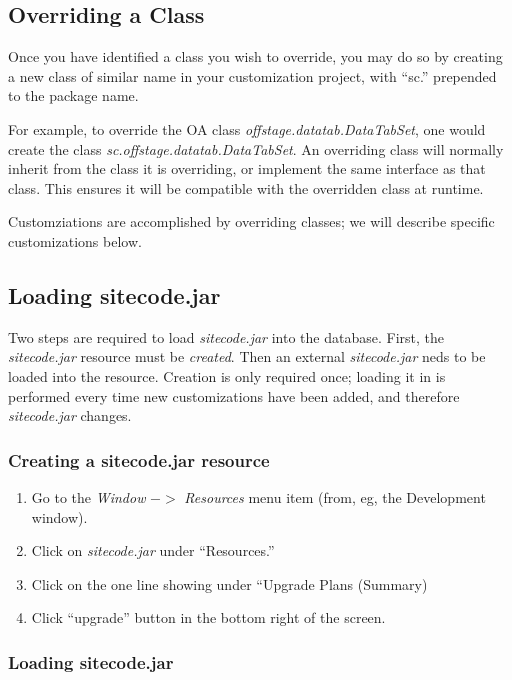 \documentclass[11pt]{article}
\begin{document}
\subsection{Overriding a Class}

Once you have identified a class you wish to override, you may do so by creating a new class of similar name in your customization project, with ``sc.'' prepended to the package name.

For example, to override the OA class \emph{offstage.datatab.DataTabSet}, one would create the class \emph{sc.offstage.datatab.DataTabSet}.  An overriding class will normally inherit from the class it is overriding, or implement the same interface as that class.  This ensures it will be compatible with the overridden class at runtime.

Customziations are accomplished by overriding classes; we will describe specific customizations below.

\subsection{Loading sitecode.jar}

Two steps are required to load \emph{sitecode.jar} into the database.  First, the \emph{sitecode.jar} resource must be \emph{created}.  Then an external \emph{sitecode.jar} neds to be loaded into the resource.  Creation is only required once; loading it in is performed every time new customizations have been added, and therefore \emph{sitecode.jar} changes.

\subsubsection{Creating a sitecode.jar resource}

\begin{enumerate}
\item Go to the \emph{Window} $->$ \emph{Resources} menu item (from, eg, the Development window).
 \item Click on \emph{sitecode.jar} under ``Resources.''

\item Click on the one line showing under ``Upgrade Plans (Summary)

\item Click ``upgrade'' button in the bottom right of the screen.

\end{enumerate}

\subsubsection{Loading sitecode.jar}
\end{document}

